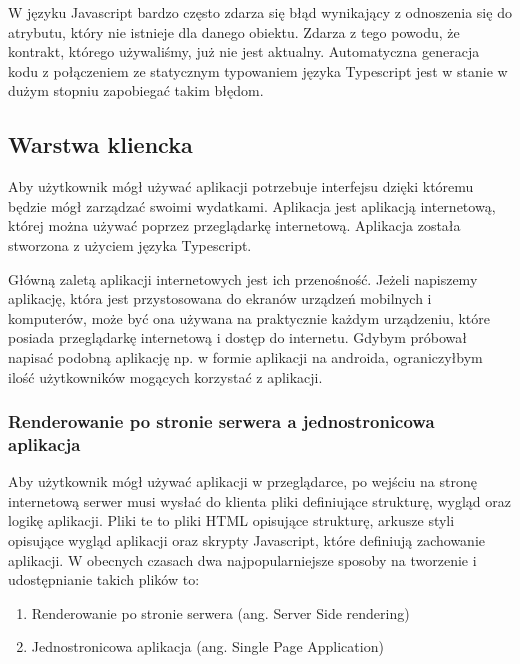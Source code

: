 W języku Javascript bardzo często zdarza się błąd wynikający z odnoszenia się do atrybutu, który nie istnieje dla danego obiektu. Zdarza z tego powodu, że kontrakt, którego używaliśmy, już nie jest aktualny. Automatyczna generacja kodu z połączeniem ze statycznym typowaniem języka Typescript jest w stanie w dużym stopniu zapobiegać takim błędom.

\subsection{Warstwa kliencka}
Aby użytkownik mógł używać aplikacji potrzebuje interfejsu dzięki któremu będzie mógł zarządzać swoimi wydatkami. Aplikacja jest aplikacją internetową, której można używać poprzez przeglądarkę internetową. Aplikacja została stworzona z użyciem języka Typescript.

Główną zaletą aplikacji internetowych jest ich przenośność. Jeżeli napiszemy aplikację, która jest przystosowana do ekranów urządzeń mobilnych i komputerów, może być ona używana na praktycznie każdym urządzeniu, które posiada przeglądarkę internetową i dostęp do internetu. Gdybym próbował napisać podobną aplikację np. w formie aplikacji na androida, ograniczyłbym ilość użytkowników mogących korzystać z aplikacji.
\subsubsection{Renderowanie po stronie serwera a jednostronicowa aplikacja}
Aby użytkownik mógł używać aplikacji w przeglądarce, po wejściu na stronę internetową serwer musi wysłać do klienta pliki definiujące strukturę, wygląd oraz logikę aplikacji. Pliki te to pliki HTML opisujące strukturę, arkusze styli opisujące wygląd aplikacji oraz skrypty Javascript, które definiują zachowanie aplikacji.
W obecnych czasach dwa najpopularniejsze sposoby na tworzenie i udostępnianie takich plików to:
\begin{enumerate}
  \item Renderowanie po stronie serwera (ang. Server Side rendering)
  \item Jednostronicowa aplikacja (ang. Single Page Application)
\end{enumerate}

